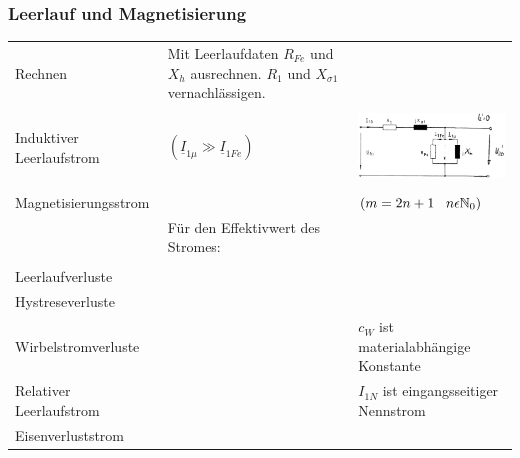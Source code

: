 		\subsubsection{Leerlauf und Magnetisierung}
			\begin{tabular}{p{5cm}p{6cm}p{7cm}}
            	Rechnen &
            		\begin{minipage}{13cm}
                    	Mit Leerlaufdaten $R_{Fe}$ und $X_h$ ausrechnen. $R_1$ und $X_{\sigma1}$ vernachlässigen.
                    \end{minipage} \\ \\
            	Induktiver Leerlaufstrom &
            		\fbox{$\underline{I}_{10} = \underline{I}_{1Fe} + \underline{I}_{1\mu}$} $(\underline{I}_{1\mu} \gg \underline{I}_{1Fe})$ &
            		\begin{minipage}{8cm}
	            		\includegraphics[width=5cm]{./bilder/ErsatzschaltbildTrafoLeerlauf.png}
	            	\end{minipage} \\ \\
				Magnetisierungsstrom &
					\fbox{$i_\mu = \sqrt{2}I_{\mu1}\cdot \sin(\omega t) + \sqrt{2}I_{\mu3}\cdot \sin(3\omega t) + \sqrt{2}I_{\mu m}\cdot \sin(m\omega t)$} &
					\hspace{3.3cm}$(m=2n+1 \hspace{0.3cm} n\epsilon \mathbb{N}_0)$ \\
					&
					Für den Effektivwert des Stromes: &
					\fbox{$I_{\mu RMS} = \sqrt{I_{\mu1}^2 + I_{\mu3}^2 +\ldots+ I_{\mu m}} $}\\ \\
				Leerlaufverluste &
					\fbox{$P_0 = P_{0Cu} + P_{0Hy} + P_{0Wi}$} \\
				Hystreseverluste &
					\fbox{$P_{Hy} \sim f \cdot B^2$} \\
				Wirbelstromverluste &
					\fbox{$v_W = c_W \cdot f^2 \cdot B^2$} &
					$c_W$ ist materialabhängige Konstante \\
				Relativer Leerlaufstrom &
					\fbox{$i_{0N} = \frac{I_{0N}}{I_{1N}}$} &
					$I_{1N}$ ist eingangsseitiger Nennstrom \\
				Eisenverluststrom &
					\fbox{$I_{Fe} = \frac{P_{0N}}{U_{1N}} = I_0 \cdot \cos(\varphi_0)$} \\

\end{tabular}
